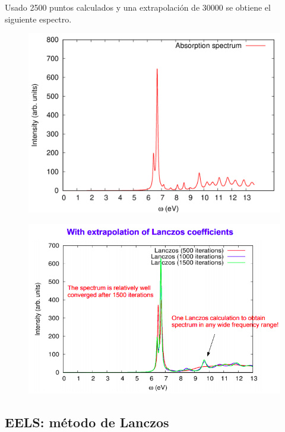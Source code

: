   Usado 2500 puntos calculados y una extrapolación de 30000 se obtiene el siguiente espectro.

  \begin{figure}[H]
      \centering
      \includegraphics[scale = 0.30]{figs/D6/Lanczos_conv.png}
  \end{figure}


  \begin{figure}[H]
      \centering
      \includegraphics[scale = 0.6]{figs/D6/Lan_extra.png}
  \end{figure}

\subsection{EELS: método de Lanczos}

